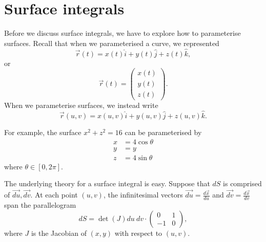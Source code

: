 \documentclass[a4paper, 12pt,oneside,openany]{book}
\begin{document}

\section{Surface integrals}

Before we discuss surface integrals, we have to explore how to parameterise surfaces. Recall that when we parameterised a curve, we represented $$\vec{r}(t) = x(t) \hat{i} + y(t) \hat{j} + z(t) \hat{k},$$ or $$\vec{r}(t) = \begin{pmatrix} x(t) \\ y(t) \\ z(t) \end{pmatrix}.$$ When we parameterise surfaces, we instead write $$\vec{r}(u, v) = x(u, v) \hat{i} + y(u, v) \hat{j} + z(u, v) \hat{k}.$$

For example, the surface $x^2+z^2=16$ can be parameterised by \begin{align*} x &= 4\cos\theta \\ y&= y \\ z&=4 \sin\theta \end{align*} where $\theta \in [0, 2\pi]$. 

The underlying theory for a surface integral is easy. Suppose that $dS$ is comprised of $\vec{du}, \vec{dv}$. At each point $(u, v)$, the infinitesimal vectors $\vec{du}=\frac{d\vec{x}}{du}$ and $\vec{dv}=\frac{d\vec{x}}{dv}$ span the parallelogram $$dS= \det(J) du\ dv \cdot \begin{pmatrix} 0 & 1 \\ -1 & 0 \end{pmatrix},$$ where $J$ is the Jacobian of $(x, y)$ with respect to $(u, v).$
\end{document}
